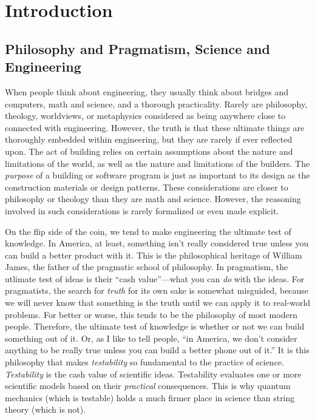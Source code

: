 \chapter{Introduction}

\section{Philosophy and Pragmatism, Science and Engineering}

When people think about engineering, they usually think about bridges and computers, math and science, and a thorough practicality.  Rarely are philosophy, theology, worldviews, or metaphysics considered as being anywhere close to connected with engineering.  However, the truth is that these ultimate things are thoroughly embedded within engineering, but they are rarely if ever reflected upon.  
The act of building relies on certain assumptions about the nature and limitations of the world, as well as the nature and limitations of the builders.  
The \textit{purpose} of a building or software program is just as important to its design as the construction materials or design patterns. 
These considerations are closer to philosophy or theology than they are math and science.  However, the reasoning involved in such considerations is rarely
formalized or even made explicit.

On the flip side of the coin, we tend to make engineering the ultimate test of knowledge.  In America, at least, something isn't really considered true unless you can build a better product with it.  This is the philosophical heritage of William James, the father of the pragmatic school of philosophy.  In pragmatism, the utlimate test of ideas is their ``cash value''---what you can \textit{do} with the ideas.  For pragmatists, the search for \textit{truth} for its own sake is somewhat misguided, because we will never know that something is the truth until we can apply it to real-world problems.  For better or worse, this tends to be the philosophy of most modern people.  Therefore, the ultimate test of knowledge is whether or not we can build something out of it.  Or, as I like to tell people, ``in America, we don't consider anything to be really true unless you can build a better phone out of it.''  It is this philosophy that makes \textit{testability} so fundamental to the practice of science.  \textit{Testability} is the cash value of scientific ideas.  Testability evaluates one or more scientific models based on their \textit{practical} consequences.  This is why quantum mechanics (which is testable) holds a much firmer place in science than string theory (which is not). 

